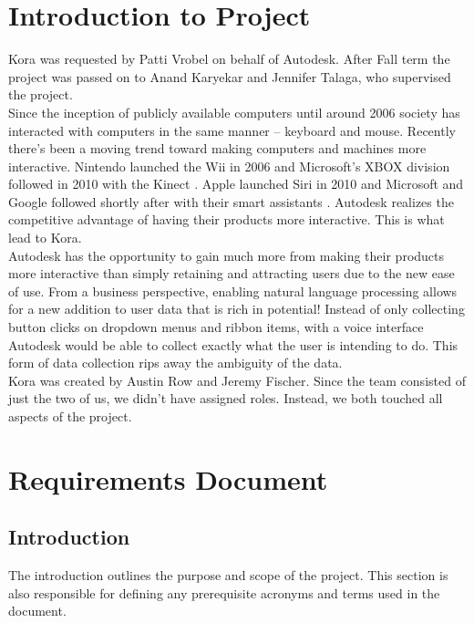 \documentclass[onecolumn, draftclsnofoot,10pt, compsoc]{IEEEtran}
\newcommand{\newpara}{\\[0.1in]}
\begin{document}

\section{Introduction to Project}
	Kora was requested by Patti Vrobel on behalf of Autodesk. 
	After Fall term the project was passed on to Anand Karyekar and Jennifer Talaga, who supervised the project.
	\newpara
	Since the inception of publicly available computers until around 2006 society has interacted with computers in the same manner – keyboard and mouse. 
	Recently there’s been a moving trend toward making computers and machines more interactive. 
	Nintendo launched the Wii in 2006 and Microsoft’s XBOX division followed in 2010 with the Kinect \cite{wii}\cite{kinect}.
	 Apple launched Siri in 2010 and Microsoft and Google followed shortly after with their smart assistants \cite{siri}. 
	 Autodesk realizes the competitive advantage of having their products more interactive.
	 This is what lead to Kora.
	\newpara
	Autodesk has the opportunity to gain much more from making their products more interactive than simply retaining and attracting users due to the new ease of use. 
	From a business perspective, enabling natural language processing allows for a new addition to user data that is rich in potential!
	Instead of only collecting button clicks on dropdown menus and ribbon items, with a voice interface Autodesk would be able to collect exactly what the user is intending to do.
	This form of data collection rips away the ambiguity of the data. 
	\newpara
	Kora was created by Austin Row and Jeremy Fischer.
	Since the team consisted of just the two of us, we didn't have assigned roles.
	Instead, we both touched all aspects of the project.
	












\section{Requirements Document}

	\subsection{Introduction}
	The introduction outlines the purpose and scope of the project.
	This section is also responsible for defining any prerequisite acronyms and terms used in the document.
\end{document}
